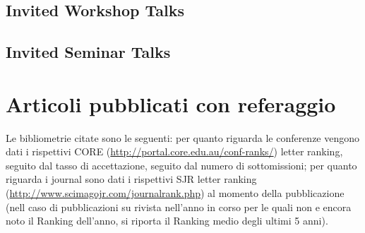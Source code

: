 \documentclass[10pt,a4paper,sans]{moderncv}
\begin{document}
 \subsection{Invited Workshop Talks}
%



\subsection{Invited Seminar Talks}



\newpage
\section{Articoli pubblicati con referaggio}



Le bibliometrie citate sono le seguenti: per quanto riguarda le conferenze 
vengono dati i rispettivi CORE 
(\url{http://portal.core.edu.au/conf-ranks/}) letter ranking, seguito dal 
tasso di accettazione, seguito dal numero di sottomissioni; per quanto 
riguarda i journal sono dati i rispettivi SJR letter ranking 
(\url{http://www.scimagojr.com/journalrank.php}) al momento della 
pubblicazione (nell caso di pubblicazioni su rivista nell'anno in corso per le quali
non e encora noto il Ranking dell'anno, si riporta il Ranking medio degli ultimi 5 anni).
\end{document}
